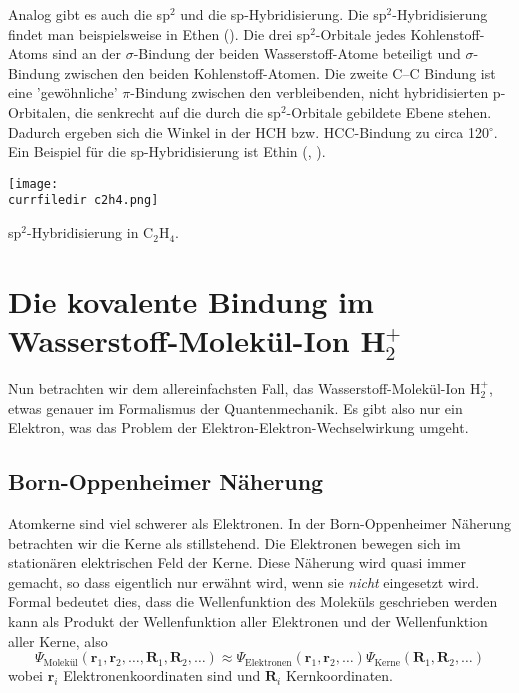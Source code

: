 Analog gibt es auch die sp$^2$ und die sp-Hybridisierung.  Die sp$^2$-Hybridisierung findet man beispielsweise in Ethen (). Die drei  sp$^2$-Orbitale jedes Kohlenstoff-Atoms sind an der $\sigma$-Bindung der beiden Wasserstoff-Atome beteiligt und $\sigma$-Bindung zwischen den beiden Kohlenstoff-Atomen. Die zweite C--C Bindung ist eine 'gewöhnliche' $\pi$-Bindung zwischen den verbleibenden, nicht hybridisierten p-Orbitalen, die senkrecht auf die durch die sp$^2$-Orbitale gebildete Ebene stehen. Dadurch ergeben sich die Winkel in der HCH bzw. HCC-Bindung zu circa 120$^\circ$. Ein Beispiel für die sp-Hybridisierung ist Ethin (,  ).

%
\begin{marginfigure}
\texttt{[image: \\currfiledir c2h4.png]}
\caption{sp$^2$-Hybridisierung in C$_2$H$_4$. }
\end{marginfigure}
%




\section{Die kovalente Bindung im Wasserstoff-Molekül-Ion H$_2^+$}


Nun betrachten wir dem allereinfachsten Fall, das Wasserstoff-Molekül-Ion H$_2^+$, etwas genauer im Formalismus der Quantenmechanik.  Es gibt also nur ein Elektron, was das Problem der Elektron-Elektron-Wechselwirkung umgeht.


\subsection{Born-Oppenheimer Näherung}

Atomkerne sind viel schwerer als Elektronen. In der Born-Oppenheimer Näherung betrachten wir die Kerne als stillstehend. Die Elektronen bewegen sich im stationären elektrischen Feld der Kerne. Diese Näherung wird quasi immer gemacht, so dass eigentlich nur erwähnt wird, wenn sie \emph{nicht} eingesetzt wird. Formal bedeutet dies, dass die Wellenfunktion des Moleküls geschrieben werden kann als Produkt der Wellenfunktion aller Elektronen und der Wellenfunktion aller Kerne, also
\begin{equation}
\Psi_{\text{Molekül}}(\mathbf{r}_1, \mathbf{r}_2, \dots, \mathbf{R}_1, \mathbf{R}_2, \dots)
  \approx
  \Psi_{\text{Elektronen}}(\mathbf{r}_1, \mathbf{r}_2, \dots )
\Psi_{\text{Kerne}}( \mathbf{R}_1, \mathbf{R}_2, \dots)
\end{equation}
wobei $\mathbf{r}_i$ Elektronenkoordinaten sind und $\mathbf{R}_i$ Kernkoordinaten.


